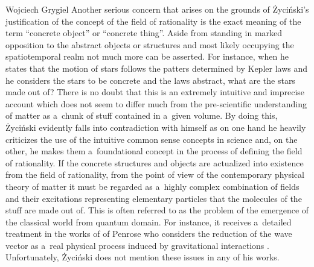 \begin{artengenv}{Wojciech Grygiel}
Another serious concern that arises on the grounds of Życiński's justification of the concept of the field of rationality is the exact meaning of the term ``concrete object'' or ``concrete thing''. Aside from standing in marked opposition to the abstract objects or structures and most likely occupying the spatiotemporal realm not much more can be asserted. For instance, when he states that the motion of stars follows the patters determined by Kepler laws and he considers the stars to be concrete and the laws abstract, what are the stars made out of? There is no doubt that this is an extremely intuitive and imprecise account which does not seem to differ much from the pre-scientific understanding of matter as a~chunk of stuff contained in a~given volume. By doing this, Życiński evidently falls into contradiction with himself as on one hand he heavily criticizes the use of the intuitive common sense concepts in science and, on the other, he makes them a~foundational concept in the process of defining the field of rationality. If the concrete structures and objects are actualized into existence from the field of rationality, from the point of view of the contemporary physical theory of matter it must be regarded as a~highly complex combination of fields and their excitations representing elementary particles that the molecules of the stuff are made out of. This is often referred to as the problem of the emergence of the classical world from quantum domain. For instance, it receives a~detailed treatment in the works of of Penrose who considers the reduction of the wave vector as a~real physical process induced by gravitational interactions
\parencite[e.g.][pp.816–868]{penrose_road_2005}. %
 Unfortunately, Życiński does not mention these issues in any of his works.


\end{artengenv}
